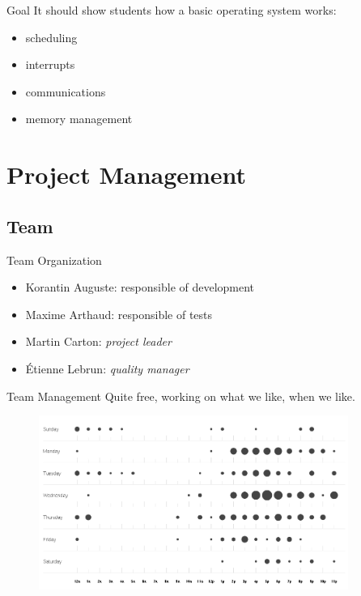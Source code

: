 \documentclass{beamer}
\begin{document}
    \begin{frame}{Goal}
      It should show students how a basic operating system works:
        \begin{itemize}
          \item scheduling
          \item interrupts
          \item communications
          \item memory management
        \end{itemize}
    \end{frame}

  \section{Project Management}
    \subsection{Team}
      \begin{frame}{Team Organization}
        \begin{itemize}
          \item Korantin Auguste: responsible of development
          \item Maxime Arthaud: responsible of tests
          \item Martin Carton: \textit{project leader}
          \item Étienne Lebrun: \textit{quality manager}
        \end{itemize}
      \end{frame}

      \begin{frame}{Team Management}
        Quite free, working on what we like, when we like.

        \pause
        \begin{figure}
          \centering
          \includegraphics[width=0.9\textwidth]{fig/punchcard.png}
        \end{figure}
      \end{frame}
\end{document}
